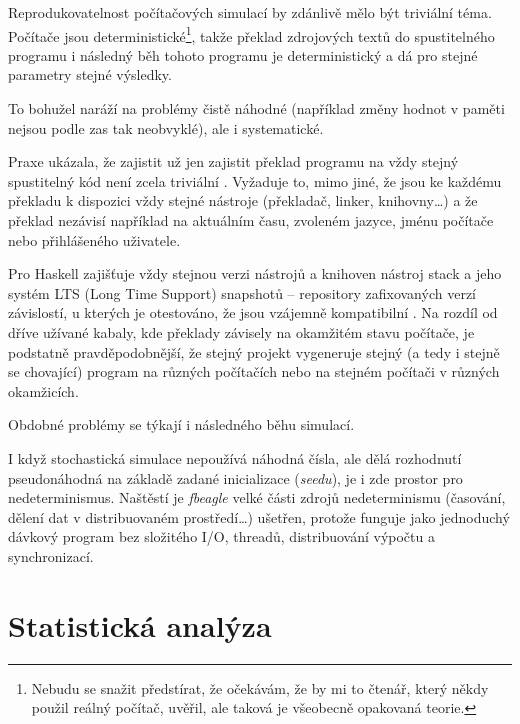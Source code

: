 \begin{tcolorbox}[ title={Reprodukovatelnost v počítačových simulacích}
                 , breakable
                 ]
Reprodukovatelnost počítačových simulací by zdánlivě mělo být triviální téma. Počítače jsou
deterministické\footnote{
Nebudu se snažit předstírat, že očekávám, že by mi to čtenář, který někdy použil reálný počítač, uvěřil, ale
taková je všeobecně opakovaná teorie.
}, takže překlad zdrojových textů do spustitelného programu i následný běh tohoto
programu je deterministický a dá pro stejné parametry stejné výsledky.

To bohužel naráží na problémy čistě náhodné (například  změny hodnot v paměti
nejsou podle \citet{schroeder2011dram} zas tak neobvyklé), ale i systematické.

Praxe ukázala, že zajistit už jen zajistit překlad programu na vždy stejný spustitelný kód není zcela triviální \citep{bobbio2014reproducibl}.
Vyžaduje to, mimo jiné, že jsou ke každému překladu k dispozici vždy stejné nástroje (překladač, linker,
knihovny\ldots) a že překlad nezávisí například na aktuálním času, zvoleném jazyce, jménu počítače nebo přihlášeného uživatele.

Pro Haskell zajišťuje vždy stejnou verzi nástrojů a knihoven nástroj stack a jeho systém
LTS (Long Time Support) snapshotů -- repository zafixovaných verzí závislostí, u kterých je
otestováno, že jsou vzájemně kompatibilní \citep{stackdesign}. Na rozdíl od dříve užívané kabaly, kde překlady
závisely na okamžitém stavu počítače, je podstatně pravděpodobnější, že stejný projekt vygeneruje
stejný (a tedy i stejně se chovající) program na různých počítačích nebo na stejném počítači v různých
okamžicích\citep{stackintro}.

Obdobné problémy se týkají i následného běhu simulací.

I když stochastická simulace nepoužívá náhodná čísla, ale dělá rozhodnutí pseudonáhodná na základě zadané inicializace
(\textit{seedu}), je i zde prostor pro nedeterminismus. Naštěstí je \textit{fbeagle} velké části zdrojů
nedeterminismu (časování, dělení dat v distribuovaném prostředí\ldots) ušetřen, protože funguje jako
jednoduchý dávkový program bez složitého I/O, threadů, distribuování výpočtu a synchronizací.
\end{tcolorbox}


\section{Statistická analýza}

